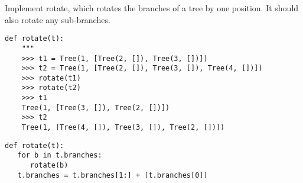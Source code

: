 \begin{blocksection}
\question Implement rotate, which rotates the branches of a tree by one position. It should also rotate any sub-branches.
\newline
\begin{lstlisting}
def rotate(t):
    """
    >>> t1 = Tree(1, [Tree(2, []), Tree(3, [])])
    >>> t2 = Tree(1, [Tree(2, []), Tree(3, []), Tree(4, [])])
    >>> rotate(t1)
    >>> rotate(t2)
    >>> t1
    Tree(1, [Tree(3, []), Tree(2, [])])
    >>> t2
    Tree(1, [Tree(4, []), Tree(3, []), Tree(2, [])])
\end{lstlisting}
\begin{solution}
\begin{lstlisting}
def rotate(t):
   for b in t.branches:
      rotate(b)
   t.branches = t.branches[1:] + [t.branches[0]]





\end{lstlisting}
\end{solution}
\end{blocksection}